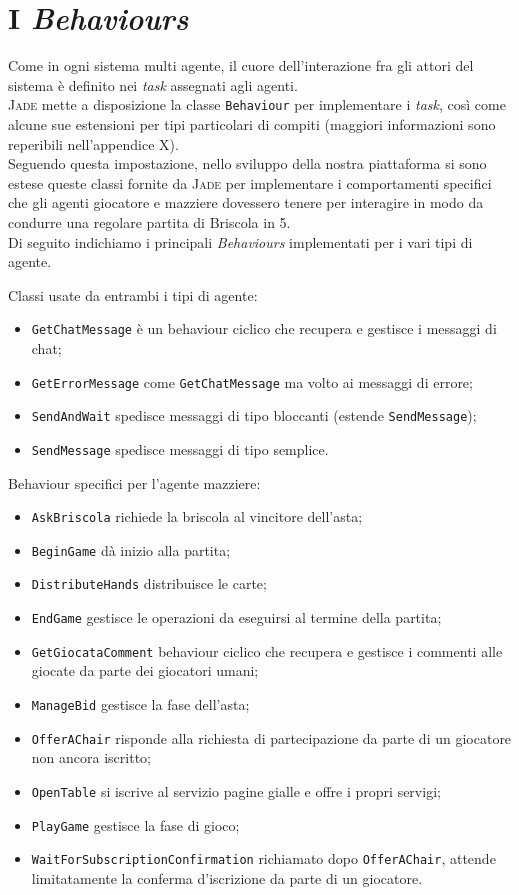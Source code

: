 \section{I \emph{Behaviours}}

Come in ogni sistema multi agente, il cuore dell'interazione fra gli attori del sistema è definito nei \emph{task} assegnati agli agenti.\\
\textsc{Jade} mette a disposizione la classe \texttt{Behaviour} per implementare i \emph{task}, così come alcune sue estensioni per tipi particolari di compiti (maggiori informazioni sono reperibili nell'appendice X).\\
Seguendo questa impostazione, nello sviluppo della nostra piattaforma si sono estese queste classi fornite da \textsc{Jade} per implementare i comportamenti specifici che gli agenti giocatore e mazziere dovessero tenere per interagire in modo da condurre una regolare partita di Briscola in 5.\\
Di seguito indichiamo i principali \emph{Behaviours} implementati per i vari tipi di agente.

Classi usate da entrambi i tipi di agente:
\begin{itemize}
   \item \texttt{GetChatMessage} è un behaviour ciclico che recupera e gestisce i messaggi di chat;
   \item \texttt{GetErrorMessage} come \texttt{GetChatMessage} ma volto ai messaggi di errore;
   \item \texttt{SendAndWait} spedisce messaggi di tipo bloccanti (estende \texttt{SendMessage});
   \item \texttt{SendMessage} spedisce messaggi di tipo semplice.
\end{itemize}

Behaviour specifici per l'agente mazziere:

\begin{itemize}
   \item \texttt{AskBriscola} richiede la briscola al vincitore dell'asta;
   \item \texttt{BeginGame} dà inizio alla partita;
   \item \texttt{DistributeHands} distribuisce le carte;
   \item \texttt{EndGame} gestisce le operazioni da eseguirsi al termine della partita;
   \item \texttt{GetGiocataComment} behaviour ciclico che recupera e gestisce i commenti alle giocate da parte dei giocatori umani;
   \item \texttt{ManageBid} gestisce la fase dell'asta;
   \item \texttt{OfferAChair} risponde alla richiesta di partecipazione da parte di un giocatore non ancora iscritto;
   \item \texttt{OpenTable} si iscrive al servizio pagine gialle e offre i propri servigi;
   \item \texttt{PlayGame} gestisce la fase di gioco;
   \item \texttt{WaitForSubscriptionConfirmation} richiamato dopo \texttt{OfferAChair}, attende limitatamente la conferma d'iscrizione da parte di un giocatore.
\end{itemize}

